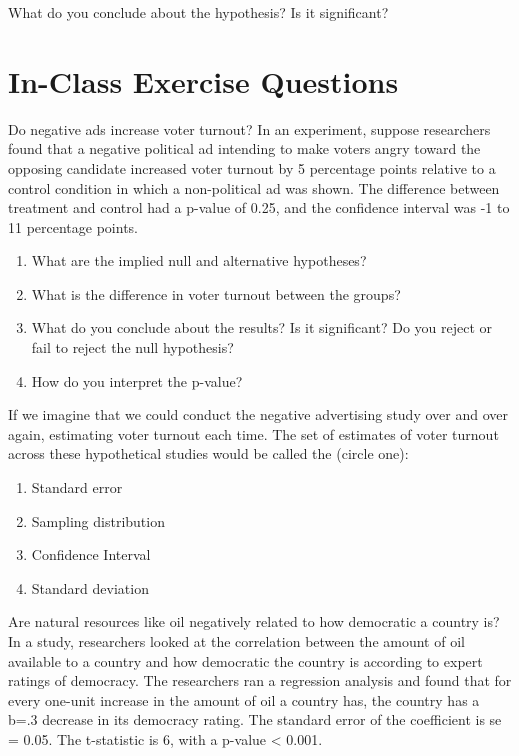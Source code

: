 \documentclass[
  letterpaper,
  DIV=11,
  numbers=noendperiod]{scrreprt}
\providecommand{\tightlist}{%
  \setlength{\itemsep}{0pt}\setlength{\parskip}{0pt}}\usepackage{longtable,booktabs,array}
\begin{document}
What do you conclude about the hypothesis? Is it significant?

\hypertarget{in-class-exercise-questions}{%
\section{In-Class Exercise
Questions}\label{in-class-exercise-questions}}

Do negative ads increase voter turnout? In an experiment, suppose
researchers found that a negative political ad intending to make voters
angry toward the opposing candidate increased voter turnout by 5
percentage points relative to a control condition in which a
non-political ad was shown. The difference between treatment and control
had a p-value of 0.25, and the confidence interval was -1 to 11
percentage points.

\begin{enumerate}
\def\labelenumi{\arabic{enumi}.}
\tightlist
\item
  What are the implied null and alternative hypotheses?
\item
  What is the difference in voter turnout between the groups?
\item
  What do you conclude about the results? Is it significant? Do you
  reject or fail to reject the null hypothesis?
\item
  How do you interpret the p-value?
\end{enumerate}

If we imagine that we could conduct the negative advertising study over
and over again, estimating voter turnout each time. The set of estimates
of voter turnout across these hypothetical studies would be called the
(circle one):

\begin{enumerate}
\def\labelenumi{\Alph{enumi}.}
\tightlist
\item
  Standard error
\item
  Sampling distribution
\item
  Confidence Interval
\item
  Standard deviation
\end{enumerate}

Are natural resources like oil negatively related to how democratic a
country is? In a study, researchers looked at the correlation between
the amount of oil available to a country and how democratic the country
is according to expert ratings of democracy. The researchers ran a
regression analysis and found that for every one-unit increase in the
amount of oil a country has, the country has a b=.3 decrease in its
democracy rating. The standard error of the coefficient is se = 0.05.
The t-statistic is 6, with a p-value \textless{} 0.001.
\end{document}
